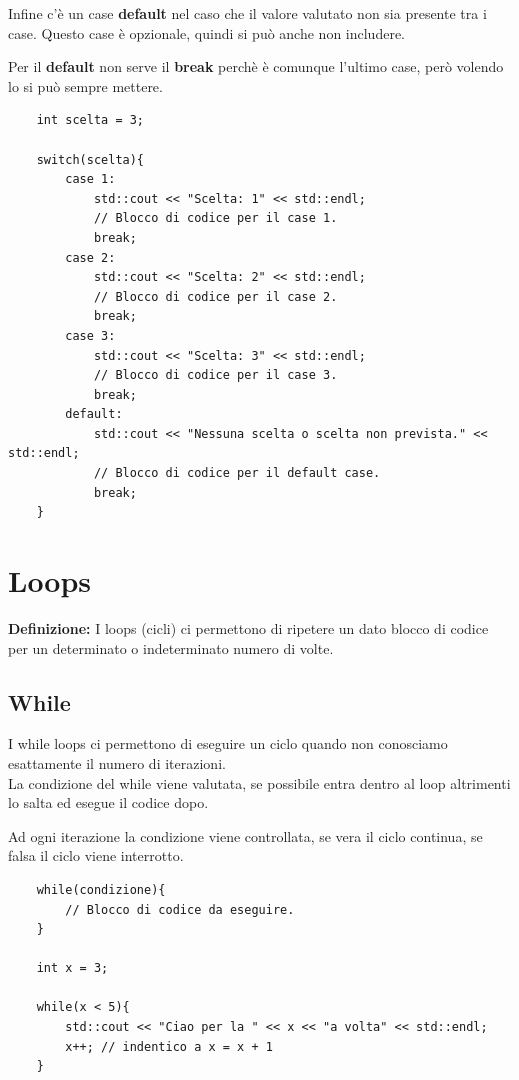\textsf{\small Infine c'è un case \textbf{default} nel caso che il valore valutato non sia presente tra i case. Questo case è opzionale, quindi si può anche non includere.}

\textsf{\small Per il \textbf{default} non serve il \textbf{break} perchè è comunque l'ultimo case, però volendo lo si può sempre mettere.} \\

\begin{lstlisting}
	int scelta = 3;
	
	switch(scelta){
		case 1:
			std::cout << "Scelta: 1" << std::endl;
			// Blocco di codice per il case 1.
			break;
		case 2:
			std::cout << "Scelta: 2" << std::endl;
			// Blocco di codice per il case 2.
			break;
		case 3:
			std::cout << "Scelta: 3" << std::endl;
			// Blocco di codice per il case 3.
			break;
		default:
			std::cout << "Nessuna scelta o scelta non prevista." << std::endl;
			// Blocco di codice per il default case.
			break;
	}
\end{lstlisting}


\newpage

\section{Loops}

\textsf{\small \textbf{Definizione: } I loops (cicli) ci permettono di ripetere un dato blocco di codice per un determinato o indeterminato numero di volte.} \\

\subsection{While}

\textsf{\small I while loops ci permettono di eseguire un ciclo quando non conosciamo esattamente il numero di iterazioni. } \\

\textsf{\small La condizione del while viene valutata, se possibile entra dentro al loop altrimenti lo salta ed esegue il codice dopo.}

\textsf{\small Ad ogni iterazione la condizione viene controllata, se vera il ciclo continua, se falsa il ciclo viene interrotto.} \\

\begin{lstlisting}
	while(condizione){
		// Blocco di codice da eseguire.
	}

	int x = 3;
	
	while(x < 5){
		std::cout << "Ciao per la " << x << "a volta" << std::endl;
		x++; // indentico a x = x + 1
	}
\end{lstlisting}

